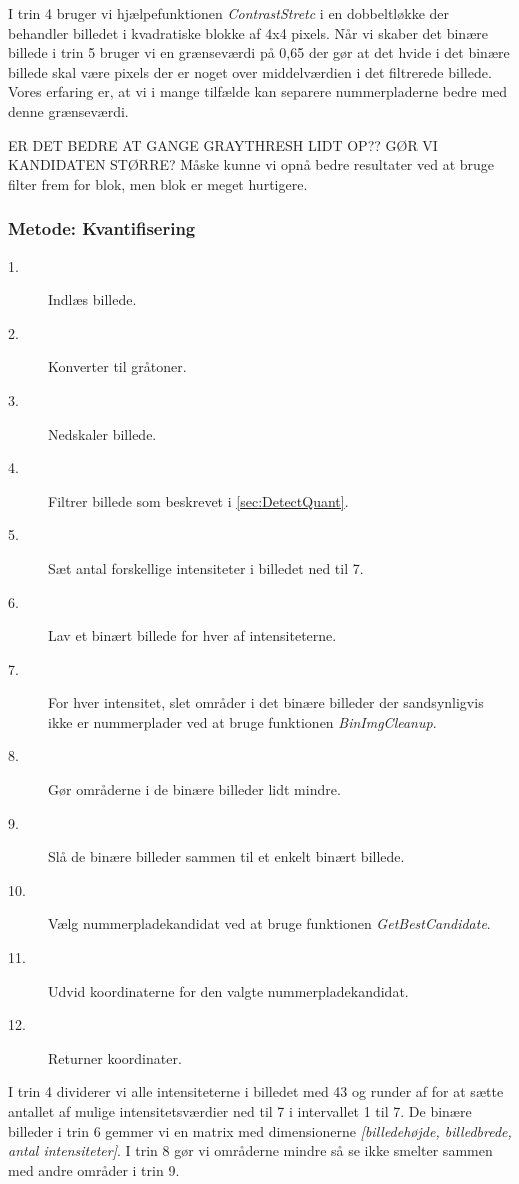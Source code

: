 I trin 4 bruger vi hjælpefunktionen \textit{ContrastStretc} i en dobbeltløkke der behandler billedet i kvadratiske blokke af 4x4 pixels. Når vi skaber det binære billede i trin 5 bruger vi en grænseværdi på 0,65 der gør at det hvide i det binære billede skal være pixels der er noget over middelværdien i det filtrerede billede. Vores erfaring er, at vi i mange tilfælde kan separere nummerpladerne bedre med denne grænseværdi.

ER DET BEDRE AT GANGE GRAYTHRESH LIDT OP??    
GØR VI KANDIDATEN STØRRE?
Måske kunne vi opnå bedre resultater ved at bruge filter frem for blok, men blok er meget hurtigere.


\subsubsection{Metode: Kvantifisering}
\begin{description}
\item[1.] Indlæs billede.
\item[2.] Konverter til gråtoner.
\item[3.] Nedskaler billede.
\item[4.] Filtrer billede som beskrevet i \ref{sec:DetectQuant}.
\item[5.] Sæt antal forskellige intensiteter i billedet ned til 7.
\item[6.] Lav et binært billede for hver af intensiteterne.
\item[7.] For hver intensitet, slet områder i det binære billeder der sandsynligvis ikke er nummerplader ved at bruge funktionen \textit{BinImgCleanup}.
\item[8.] Gør områderne i de binære billeder lidt mindre.  
\item[9.] Slå de binære billeder sammen til et enkelt binært billede. 
\item[10.] Vælg nummerpladekandidat ved at bruge funktionen \textit{GetBestCandidate}.
\item[11.] Udvid koordinaterne for den valgte nummerpladekandidat.
\item[12.] Returner koordinater.
\end{description}

I trin 4 dividerer vi alle intensiteterne i billedet med 43 og runder af for at sætte antallet af mulige intensitetsværdier ned til 7 i intervallet 1 til 7. De binære billeder i trin 6 gemmer vi en matrix med dimensionerne \textit{[billedehøjde, billedbrede, antal intensiteter]}. I trin 8 gør vi områderne mindre så se ikke smelter sammen med andre områder i trin 9.

